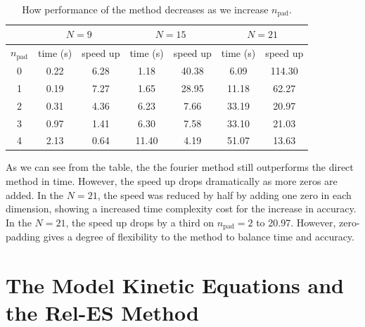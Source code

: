 \documentclass[12pt]{CSUNthesis}
\begin{document}
 \begin{table}[h]
  \begin{tabular}[c]{ c c c | c c | c c }
  \hline
  \multicolumn{1}{c}{} &
  \multicolumn{2}{c|}{$N = 9$} &
  \multicolumn{2}{c|}{$N = 15$} &
  \multicolumn{2}{c}{$N = 21$} \\
    \hline 
    $n_{\text{pad}}$ & time (s)  & speed up & time (s)  & speed up & time (s)  & speed up\\
    \hline
0 & 0.22 & 6.28 & 1.18 & 40.38 & 6.09 & 114.30\\ 
1 & 0.19 & 7.27 & 1.65 & 28.95 & 11.18 & 62.27\\ 
2 & 0.31 & 4.36 & 6.23 & 7.66 & 33.19 & 20.97\\ 
3 & 0.97 & 1.41 & 6.30 & 7.58 & 33.10 & 21.03\\ 
4 & 2.13 & 0.64 & 11.40 & 4.19 & 51.07 & 13.63\\ 
  
    \hline
  \end{tabular}
\caption{\label{tab:timing_padding_m155}  How performance of the method decreases as we increase $n_{\text{pad}}$.}
\end{table}

As we can see from the table, the the fourier method still outperforms the direct method in time. However, the speed up drops dramatically as more zeros are added. In the $N=21$, the speed was reduced by half by adding one zero in each dimension, showing a increased time complexity cost for the increase in accuracy. 
In the $N=21$, the speed up drops by a third on $n_{\text{pad}} = 2$ to 20.97. However, zero-padding gives a degree of flexibility to the method to balance time and accuracy.

\section{The Model Kinetic Equations and the Rel-ES Method}
\end{document}

